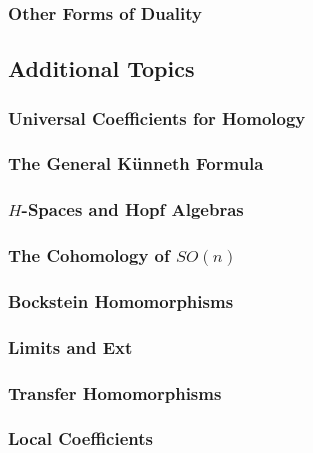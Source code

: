 \documentclass[11pt, a4paper]{article}
\begin{document}
\subsubsection{Other Forms of Duality}

\subsection*{Additional Topics}

\subsubsection{Universal Coefficients for Homology}

\subsubsection{The General K\"unneth Formula}

\subsubsection{$H$-Spaces and Hopf Algebras}

\subsubsection{The Cohomology of $SO(n)$}

\subsubsection{Bockstein Homomorphisms}

\subsubsection{Limits and Ext}

\subsubsection{Transfer Homomorphisms}

\subsubsection{Local Coefficients}

\end{document}
